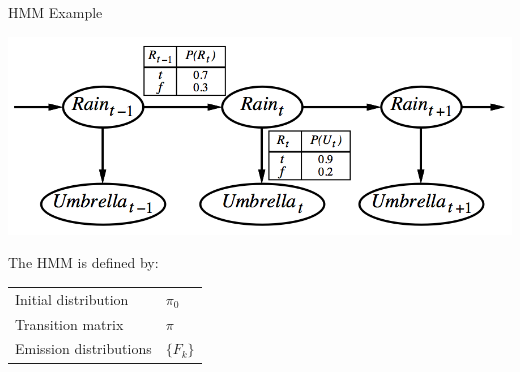 \documentclass[11pt, mathserif, handout, table]{beamer}
\begin{document}
\begin{frame}{HMM Example}
\begin{center}
\includegraphics[width=\textwidth]{img/hmm_umbrella.png}
\end{center}

\begin{center}
\begin{minipage}{0.5\textwidth}
\begin{exampleblock}{\small
 The HMM is defined by:

\begin{tabular}{ll}
Initial distribution & $\pi_0$\\
Transition matrix & $\pi$ \\
Emission distributions & $\{F_k\}$
\end{tabular}
}
\end{exampleblock}
\end{minipage}
\end{center}
\end{frame}

\end{document}
